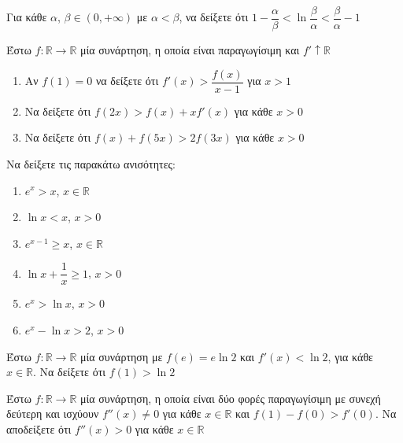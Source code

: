 \documentclass{presentation}
\begin{document}
\begin{askisi}
  Για κάθε $α$, $β\in (0,+\infty)$ με $α<β$, να δείξετε ότι $1-\dfrac{α}{β}<\ln \dfrac{β}{α}<\dfrac{β}{α}-1$

\end{askisi}

\begin{askisi}
  Έστω $f:\mathbb{R}\to\mathbb{R}$ μία συνάρτηση, η οποία είναι παραγωγίσιμη και $f'\uparrow \mathbb{R}$
  \begin{enumerate}
    \item<1-> Αν $f(1)=0$ να δείξετε ότι $f'(x)>\dfrac{f(x)}{x-1}$ για $x>1$
    \item<2-> Να δείξετε ότι $f(2x)>f(x)+xf'(x)$ για κάθε $x>0$
    \item<3-> Να δείξετε ότι $f(x)+f(5x)>2f(3x)$ για κάθε $x>0$
  \end{enumerate}

\end{askisi}

\begin{askisi}
  Να δείξετε τις παρακάτω ανισότητες:
  \begin{enumerate}
    \item<1-> $e^x> x$, $x\in\mathbb{R}$
    \item<2-> $\ln x<x$, $x>0$
    \item<3-> $e^{x-1}\ge x$, $x\in\mathbb{R}$
    \item<4-> $\ln x+\dfrac{1}{x}\ge 1$, $x>0$
    \item<5-> $e^x>\ln x$, $x>0$
    \item<6-> $e^x-\ln x>2$, $x>0$
  \end{enumerate}

\end{askisi}

\begin{askisi}
  Έστω $f:\mathbb{R}\to\mathbb{R}$ μία συνάρτηση με $f(e)=e\ln 2$ και $f'(x)<\ln 2$, για κάθε $x\in \mathbb{R}$. Να δείξετε ότι $f(1)>\ln 2$

\end{askisi}

\begin{askisi}
  Έστω $f:\mathbb{R}\to\mathbb{R}$ μία συνάρτηση, η οποία είναι δύο φορές παραγωγίσιμη με συνεχή δεύτερη και ισχύουν $f''(x)\ne 0$ για κάθε $x\in\mathbb{R}$ και $f(1)-f(0)>f'(0)$. Να αποδείξετε ότι $f''(x)>0$ για κάθε $x\in\mathbb{R}$

\end{askisi}
\end{document}
